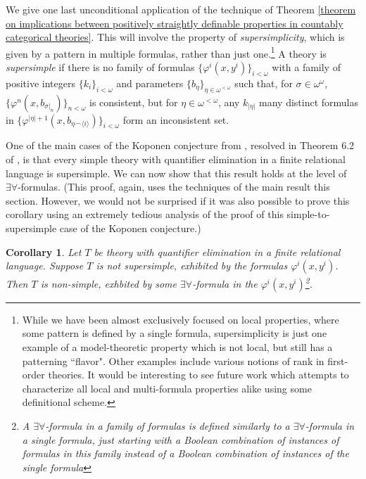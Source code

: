 \documentclass[10pt,a4paper]{amsart}
\newtheorem{corollary}{Corollary}
\begin{document}
We give one last unconditional application of the technique of Theorem \ref{theorem on implications between positively straightly definable properties in countably categorical theories}. This will involve the property of \textit{supersimplicity}, which is given by a pattern in multiple formulas, rather than just one.\footnote{While we have been almost exclusively focused on local properties, where some pattern is defined by a single formula, supersimplicity is just one example of a model-theoretic property which is not local, but still has a patterning ``flavor". Other examples include various notions of rank in first-order theories. It would be interesting to see future work which attempts to characterize all local and multi-formula properties alike using some definitional scheme.} A theory is \textit{supersimple} if there is no family of formulas $\{\varphi^{i}(x, y^{i})\}_{i < \omega}$ with a family of positive integers $\{k_{i}\}_{i < \omega}$ and parameters $\{b_{\eta}\}_{\eta \in \omega^{< \omega}}$ such that, for $\sigma \in \omega^{\omega}$, $\{\varphi^{n}(x, b_{\sigma|_{n}})\}_{n < \omega}$ is consistent, but for $\eta \in \omega^{< \omega}$, any $k_{|\eta|}$ many distinct formulas in $\{\varphi^{|\eta|+1}(x, b_{\eta \smallfrown \langle i \rangle})\}_{i < \omega}$ form an inconsistent set.

One of the main cases of the Koponen conjecture from \cite{Kop16}, resolved in Theorem 6.2 of \cite{baldwin2024simple}, is that every simple theory with quantifier elimination in a finite relational language is supersimple. We can now show that this result holds at the level of $\exists\forall$-formulas. (This proof, again, uses the techniques of the main result this section. However, we would not be surprised if it was also possible to prove this corollary using an extremely tedious analysis of the proof of this simple-to-supersimple case of the Koponen conjecture.)


\begin{corollary}
    Let $T$ be theory with quantifier elimination in a finite relational language. Suppose $T$ is not supersimple, exhibited by the formulas $\varphi^{i}(x, y^{i})$. Then $T$ is non-simple, exhbited by some $\exists\forall$-formula in the $\varphi^{i}(x, y^{i})$\footnote{A $\exists\forall$-formula in a family of formulas is defined similarly to a $\exists\forall$-formula in a single formula, just starting with a Boolean combination of instances of formulas in this family instead of a Boolean combination of instances of the single formula}.

\end{corollary}
\end{document}
